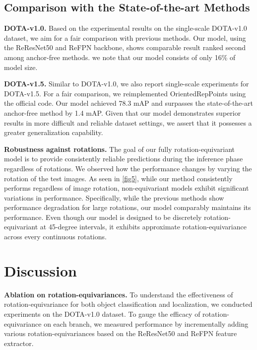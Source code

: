 \documentclass[letterpaper]{article} %
\begin{document}
\subsection{Comparison with the State-of-the-art Methods}
\textbf{DOTA-v1.0.} Based on the experimental results on the single-scale DOTA-v1.0 dataset, we aim for a fair comparison with previous methods. Our model, using the ReResNet50 and ReFPN backbone, shows comparable result ranked second among anchor-free methods. we note that our model consists of only 16\% of model size.

\noindent\textbf{DOTA-v1.5.} Similar to DOTA-v1.0, we also report single-scale experiments for DOTA-v1.5. For a fair comparison, we reimplemented OrientedRepPoints using the official code. Our model achieved 78.3 mAP and surpasses the state-of-the-art anchor-free method by 1.4 mAP. Given that our model demonstrates superior results in more difficult and reliable dataset settings, we assert that it possesses a greater generalization capability.

\noindent\textbf{Robustness against rotations.} The goal of our fully rotation-equivariant model is to provide consistently reliable predictions during the inference phase regardless of rotations. We observed how the performance changes by varying the rotation of the test images. As seen in \cref{fig5}, while our method consistently performs regardless of image rotation, non-equivariant models exhibit significant variations in performance. Specifically, while the previous methods show performance degradation for large rotations, our model comparably maintains its performance. Even though our model is designed to be discretely rotation-equivariant at 45-degree intervals, it exhibits approximate rotation-equivariance across every continuous rotations.

\section{Discussion}
\noindent\textbf{Ablation on rotation-equivariances.}
 To understand the effectiveness of rotation-equivariance for both object classification and localization, we conducted experiments on the DOTA-v1.0 dataset. To gauge the efficacy of rotation-equivariance on each branch, we measured performance by incrementally adding various rotation-equivariances based on the ReResNet50 and ReFPN feature extractor.
\end{document}
